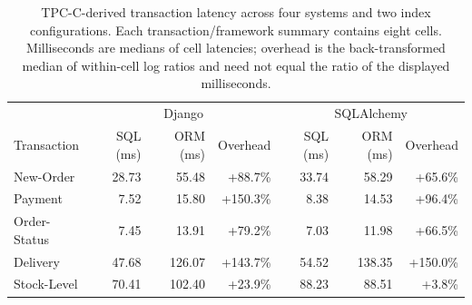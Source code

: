 \begin{table}[!t]
\caption{TPC-C-derived transaction latency across four systems and two index configurations. Each transaction/framework summary contains eight cells. Milliseconds are medians of cell latencies; overhead is the back-transformed median of within-cell log ratios and need not equal the ratio of the displayed milliseconds.}\label{tab:tpcc-latency}
\centering\small\renewcommand{\arraystretch}{1.15}
\begin{tabular}{lrrrrrr}\toprule
 & \multicolumn{3}{c}{Django} & \multicolumn{3}{c}{SQLAlchemy}\\
Transaction & SQL (ms) & ORM (ms) & Overhead & SQL (ms) & ORM (ms) & Overhead\\\midrule
New-Order & 28.73 & 55.48 & +88.7\% & 33.74 & 58.29 & +65.6\% \\
Payment & 7.52 & 15.80 & +150.3\% & 8.38 & 14.53 & +96.4\% \\
Order-Status & 7.45 & 13.91 & +79.2\% & 7.03 & 11.98 & +66.5\% \\
Delivery & 47.68 & 126.07 & +143.7\% & 54.52 & 138.35 & +150.0\% \\
Stock-Level & 70.41 & 102.40 & +23.9\% & 88.23 & 88.51 & +3.8\% \\
\bottomrule\end{tabular}\end{table}
